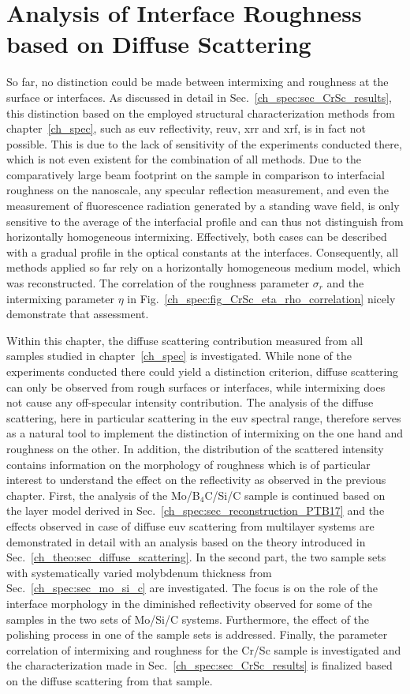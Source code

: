 \chapter{Analysis of Interface Roughness based on Diffuse Scattering} \label{ch_diff}
So far, no distinction could be made between intermixing and roughness at the surface or interfaces. As discussed in detail in Sec.~\ref{ch_spec:sec_CrSc_results}, this distinction based on the employed structural characterization methods from chapter~\ref{ch_spec}, such as \gls{euv} reflectivity, \gls{reuv}, \gls{xrr} and \gls{xrf}, is in fact not possible. This is due to the lack of sensitivity of the experiments conducted there, which is not even existent for the combination of all methods. Due to the comparatively large beam footprint on the sample in comparison to interfacial roughness on the nanoscale, any specular reflection measurement, and even the measurement of fluorescence radiation generated by a standing wave field, is only sensitive to the average of the interfacial profile and can thus not distinguish from horizontally homogeneous intermixing. Effectively, both cases can be described with a gradual profile in the optical constants at the interfaces. Consequently, all methods applied so far rely on a horizontally homogeneous medium model, which was reconstructed. The correlation of the roughness parameter $\sigma_r$ and the intermixing parameter $\eta$ in Fig.~\ref{ch_spec:fig_CrSc_eta_rho_correlation} nicely demonstrate that assessment.

Within this chapter, the diffuse scattering contribution measured from all samples studied in chapter~\ref{ch_spec} is investigated. While none of the experiments conducted there could yield a distinction criterion, diffuse scattering can only be observed from rough surfaces or interfaces, while intermixing does not cause any off-specular intensity contribution. The analysis of the diffuse scattering, here in particular scattering in the \gls{euv} spectral range, therefore serves as a natural tool to implement the distinction of intermixing on the one hand and roughness on the other. In addition, the distribution of the scattered intensity contains information on the morphology of roughness which is of particular interest to understand the effect on the reflectivity as observed in the previous chapter. First, the analysis of the Mo/B$_4$C/Si/C sample is continued based on the layer model derived in Sec.~\ref{ch_spec:sec_reconstruction_PTB17} and the effects observed in case of diffuse \gls{euv} scattering from multilayer systems are demonstrated in detail with an analysis based on the theory introduced in Sec.~\ref{ch_theo:sec_diffuse_scattering}. In the second part, the two sample sets with systematically varied molybdenum thickness from Sec.~\ref{ch_spec:sec_mo_si_c} are investigated. The focus is on the role of the interface morphology in the diminished reflectivity observed for some of the samples in the two sets of Mo/Si/C systems. Furthermore, the effect of the polishing process in one of the sample sets is addressed. Finally, the parameter correlation of intermixing and roughness for the Cr/Sc sample is investigated and the characterization made in Sec.~\ref{ch_spec:sec_CrSc_results} is finalized based on the diffuse scattering from that sample.


